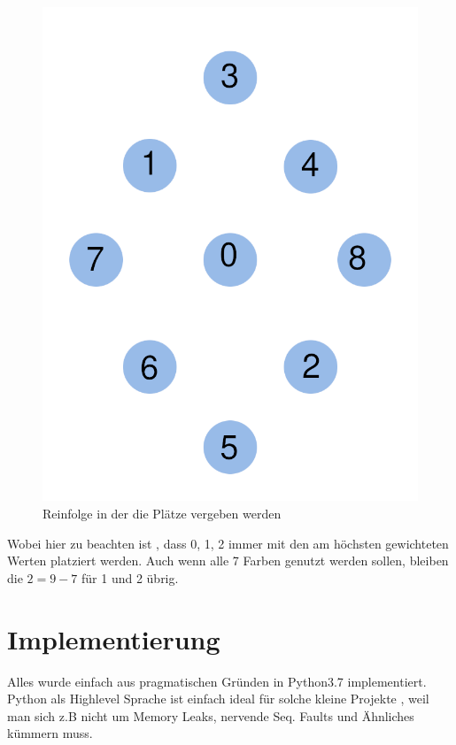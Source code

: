 \documentclass{article}
\begin{document}
\begin{figure}[h]
	\centering
	\includegraphics{priority_places}
	\caption{Reinfolge in der die Plätze vergeben werden}
\end{figure}


\newpage

Wobei hier zu beachten ist , dass 0, 1, 2 immer mit den am höchsten gewichteten Werten platziert werden. Auch wenn alle 7 Farben genutzt werden sollen, bleiben die \( 2 = 9 - 7\) für 1 und 2 übrig.

\section{Implementierung}

Alles wurde einfach aus pragmatischen Gründen in Python3.7 implementiert. Python als Highlevel Sprache ist einfach ideal für solche kleine Projekte , weil man sich z.B nicht um Memory Leaks, nervende Seq. Faults und Ähnliches kümmern muss.
\end{document}
